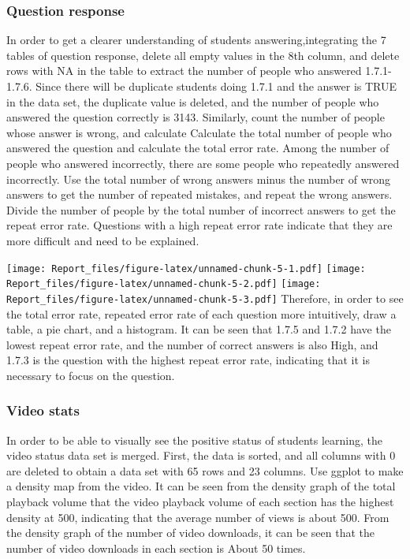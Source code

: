 \documentclass[
]{article}
\begin{document}
\hypertarget{question-response}{%
\subsubsection{Question response}\label{question-response}}

In order to get a clearer understanding of students
answering,integrating the 7 tables of question response, delete all
empty values in the 8th column, and delete rows with NA in the table to
extract the number of people who answered 1.7.1-1.7.6. Since there will
be duplicate students doing 1.7.1 and the answer is TRUE in the data
set, the duplicate value is deleted, and the number of people who
answered the question correctly is 3143. Similarly, count the number of
people whose answer is wrong, and calculate Calculate the total number
of people who answered the question and calculate the total error rate.
Among the number of people who answered incorrectly, there are some
people who repeatedly answered incorrectly. Use the total number of
wrong answers minus the number of wrong answers to get the number of
repeated mistakes, and repeat the wrong answers. Divide the number of
people by the total number of incorrect answers to get the repeat error
rate. Questions with a high repeat error rate indicate that they are
more difficult and need to be explained.

\texttt{[image: Report\_files/figure-latex/unnamed-chunk-5-1.pdf]}
\texttt{[image: Report\_files/figure-latex/unnamed-chunk-5-2.pdf]}
\texttt{[image: Report\_files/figure-latex/unnamed-chunk-5-3.pdf]}
Therefore, in order to see the total error rate, repeated error rate of
each question more intuitively, draw a table, a pie chart, and a
histogram. It can be seen that 1.7.5 and 1.7.2 have the lowest repeat
error rate, and the number of correct answers is also High, and 1.7.3 is
the question with the highest repeat error rate, indicating that it is
necessary to focus on the question.

\hypertarget{video-stats}{%
\subsubsection{Video stats}\label{video-stats}}

In order to be able to visually see the positive status of students
learning, the video status data set is merged. First, the data is
sorted, and all columns with 0 are deleted to obtain a data set with 65
rows and 23 columns. Use ggplot to make a density map from the video. It
can be seen from the density graph of the total playback volume that the
video playback volume of each section has the highest density at 500,
indicating that the average number of views is about 500. From the
density graph of the number of video downloads, it can be seen that the
number of video downloads in each section is About 50 times.
\end{document}
